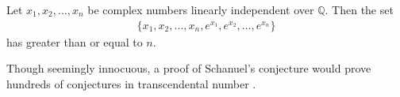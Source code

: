 \documentclass[12pt]{article}
\newcommand{\mb}{\mathbb}
\newcommand{\Q}{\mb{Q}}
\newcommand{\<}{\langle}
\renewcommand{\>}{\rangle}
\begin{document}
Let $x_1, x_2, \ldots, x_n$ be complex numbers linearly independent over $\Q$.  Then the set
\begin{align*}
\{x_1,x_2,\ldots,x_n,e^{x_1},e^{x_2},\ldots,e^{x_n}\}
\end{align*}
has  greater than or equal to $n$.  

Though seemingly innocuous, a proof of Schanuel's conjecture would prove hundreds of  conjectures in transcendental number .
\end{document}
